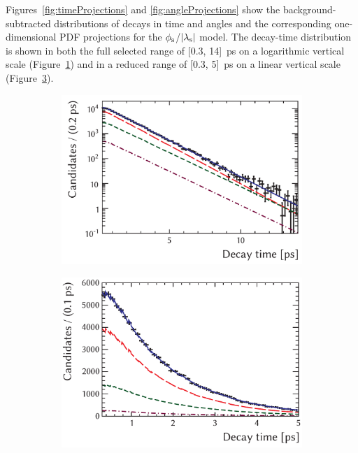 Figures~\ref{fig:timeProjections} and \ref{fig:angleProjections} show the background-subtracted distributions of decays in time and angles
and the corresponding one-dimensional PDF projections for the $\phi_\text{s}$/$|{\lambda_{\text{s}}}|$ model. The decay-time distribution is shown in both the
full selected range of [0.3, 14]~ps on a logarithmic vertical scale (Figure~\ref{fig:timeProjections_log}) and in a reduced range of [0.3,
5]~ps on a linear vertical scale (Figure~\ref{fig:timeProjections_lin}).
\begin{figure}[htb]
  \centering
  \begin{subfigure}{0.49\textwidth}
    \includegraphics[width=\textwidth]{graphics/results/timeLog}
    \caption{}
    \label{fig:timeProjections_log}
  \end{subfigure}
  \hfill%
  \begin{subfigure}{0.49\textwidth}
    \includegraphics[width=\textwidth]{graphics/results/timeLin}
    \caption{}
    \label{fig:timeProjections_lin}
  \end{subfigure}


\end{figure}
